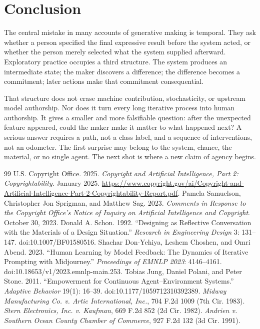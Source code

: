 \documentclass[11pt]{article}
\begin{document}
\section{Conclusion}
The central mistake in many accounts of generative making is temporal. They ask whether a person specified the final expressive result before the system acted, or whether the person merely selected what the system supplied afterward. Exploratory practice occupies a third structure. The system produces an intermediate state; the maker discovers a difference; the difference becomes a commitment; later actions make that commitment consequential.

That structure does not erase machine contribution, stochasticity, or upstream model authorship. Nor does it turn every long iterative process into human authorship. It gives a smaller and more falsifiable question: after the unexpected feature appeared, could the maker make it matter to what happened next? A serious answer requires a path, not a class label, and a sequence of interventions, not an odometer. The first surprise may belong to the system, chance, the material, or no single agent. The next shot is where a new claim of agency begins.

\begin{thebibliography}{99}
 U.S. Copyright Office. 2025. \textit{Copyright and Artificial Intelligence, Part 2: Copyrightability}. January 2025. \url{https://www.copyright.gov/ai/Copyright-and-Artificial-Intelligence-Part-2-Copyrightability-Report.pdf}.
 Pamela Samuelson, Christopher Jon Sprigman, and Matthew Sag. 2023. \textit{Comments in Response to the Copyright Office's Notice of Inquiry on Artificial Intelligence and Copyright}. October 30, 2023.
 Donald A. Schon. 1992. ``Designing as Reflective Conversation with the Materials of a Design Situation.'' \textit{Research in Engineering Design} 3: 131--147. doi:10.1007/BF01580516.
 Shachar Don-Yehiya, Leshem Choshen, and Omri Abend. 2023. ``Human Learning by Model Feedback: The Dynamics of Iterative Prompting with Midjourney.'' \textit{Proceedings of EMNLP 2023}: 4146--4161. doi:10.18653/v1/2023.emnlp-main.253.
 Tobias Jung, Daniel Polani, and Peter Stone. 2011. ``Empowerment for Continuous Agent--Environment Systems.'' \textit{Adaptive Behavior} 19(1): 16--39. doi:10.1177/1059712310392389.
 \textit{Midway Manufacturing Co. v. Artic International, Inc.}, 704 F.2d 1009 (7th Cir. 1983).
 \textit{Stern Electronics, Inc. v. Kaufman}, 669 F.2d 852 (2d Cir. 1982).
 \textit{Andrien v. Southern Ocean County Chamber of Commerce}, 927 F.2d 132 (3d Cir. 1991).
\end{thebibliography}
\end{document}
